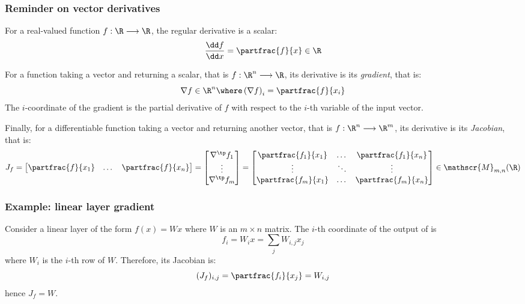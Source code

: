 \subsubsection{Reminder on vector derivatives}
For a real-valued function $f:\R\longrightarrow\R$, the regular derivative is a scalar:
\begin{equation*}
    \frac{\dd f}{\dd x} = \partfrac{f}{x} \in \R
\end{equation*}

For a function taking a vector and returning a scalar, that is $f:\R^n\longrightarrow\R$, its derivative is its \emph{gradient}, that is:
\begin{equation*}
    \nabla f\in\R^n \where \left(\nabla f\right)_i = \partfrac{f}{x_i}
\end{equation*}
The $i$-coordinate of the gradient is the partial derivative of $f$ with respect to the $i$-th variable of the input vector.

Finally, for a differentiable function taking a vector and returning another vector, that is $f:\R^n\longrightarrow\R^m$, its derivative is its \emph{Jacobian}, that is:
\begin{equation*}
    J_f 
    = \begin{bmatrix} \partfrac{f}{x_1} & \dots & \partfrac{f}{x_n}\end{bmatrix} 
    = \begin{bmatrix} 
        \nabla^\tp f_1\\ 
        \vdots\\ 
        \nabla^\tp f_m
    \end{bmatrix}
    = \begin{bmatrix}
        \partfrac{f_1}{x_1} & \dots & \partfrac{f_1}{x_n}\\
        \vdots & \ddots & \vdots\\
        \partfrac{f_m}{x_1} & \dots & \partfrac{f_m}{x_n}
    \end{bmatrix}
    \in\mathscr{M}_{m, n}(\R)
\end{equation*}

\subsubsection{Example: linear layer gradient}
Consider a linear layer of the form $f(x)=Wx$ where $W$ is an $m\times n$ matrix. The $i$-th coordinate of the output of is
\begin{equation*}
    f_i = W_ix=\sum_j W_{i,j}x_j
\end{equation*}
where $W_i$ is the $i$-th row of $W$. Therefore, its Jacobian is:
\begin{equation*}
    (J_f)_{i, j} = \partfrac{f_i}{x_j} = W_{i, j}
\end{equation*}
hence $J_f=W$.

